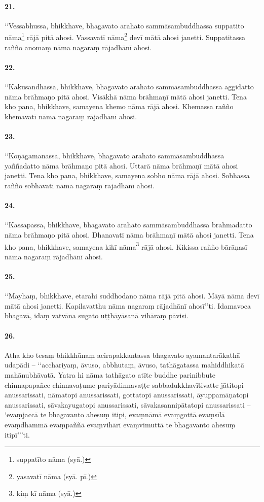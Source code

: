 \paragraph{21.} ‘‘Vessabhussa, bhikkhave, bhagavato arahato sammāsambuddhassa suppatito nāma\footnote{suppatīto nāma (syā.)} rājā pitā ahosi. Vassavatī nāma\footnote{yasavatī nāma (syā. pī.)} devī mātā ahosi janetti. Suppatitassa rañño anomaṃ nāma nagaraṃ rājadhānī ahosi.

\paragraph{22.} ‘‘Kakusandhassa, bhikkhave, bhagavato arahato sammāsambuddhassa aggidatto nāma brāhmaṇo pitā ahosi. Visākhā nāma brāhmaṇī mātā ahosi janetti. Tena kho pana, bhikkhave, samayena khemo nāma rājā ahosi. Khemassa rañño khemavatī nāma nagaraṃ rājadhānī ahosi.

\paragraph{23.} ‘‘Koṇāgamanassa, bhikkhave, bhagavato arahato sammāsambuddhassa yaññadatto nāma brāhmaṇo pitā ahosi. Uttarā nāma brāhmaṇī mātā ahosi janetti. Tena kho pana, bhikkhave, samayena sobho nāma rājā ahosi. Sobhassa rañño sobhavatī nāma nagaraṃ rājadhānī ahosi.

\paragraph{24.} ‘‘Kassapassa, bhikkhave, bhagavato arahato sammāsambuddhassa brahmadatto nāma brāhmaṇo pitā ahosi. Dhanavatī nāma brāhmaṇī mātā ahosi janetti. Tena kho pana, bhikkhave, samayena kikī nāma\footnote{kiṃ kī nāma (syā.)} rājā ahosi. Kikissa rañño bārāṇasī nāma nagaraṃ rājadhānī ahosi.

\paragraph{25.} ‘‘Mayhaṃ, bhikkhave, etarahi suddhodano nāma rājā pitā ahosi. Māyā nāma devī mātā ahosi janetti. Kapilavatthu nāma nagaraṃ rājadhānī ahosī’’ti. Idamavoca bhagavā, idaṃ vatvāna sugato uṭṭhāyāsanā vihāraṃ pāvisi.

\paragraph{26.} Atha kho tesaṃ bhikkhūnaṃ acirapakkantassa bhagavato ayamantarākathā udapādi – ‘‘acchariyaṃ, āvuso, abbhutaṃ, āvuso, tathāgatassa mahiddhikatā mahānubhāvatā. Yatra hi nāma tathāgato atīte buddhe parinibbute chinnapapañce chinnavaṭume pariyādinnavaṭṭe sabbadukkhavītivatte jātitopi anussarissati, nāmatopi anussarissati, gottatopi anussarissati, āyuppamāṇatopi anussarissati, sāvakayugatopi anussarissati, sāvakasannipātatopi anussarissati – ‘evaṃjaccā te bhagavanto ahesuṃ itipi, evaṃnāmā evaṃgottā evaṃsīlā evaṃdhammā evaṃpaññā evaṃvihārī evaṃvimuttā te bhagavanto ahesuṃ itipī’’’ti.

